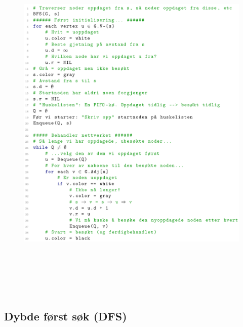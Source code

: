 \documentclass[12pt]{report}
\begin{document}
\begin{figure}[H]
	\begin{Center}
		\includegraphics[width=6.3in,height=6.95in]{./media/image183.png}
	\end{Center}
\end{figure}






\newpage
\par

\subsection*{Dybde først søk (DFS)}


\end{document}
